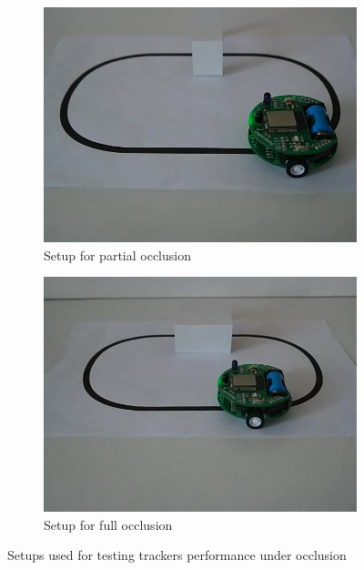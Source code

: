 \begin{figure}
\centering
\begin{subfigure}{0.48\linewidth}
\includegraphics[width=\linewidth]{img/experiments/partial-occlusion.jpg}
\caption{Setup for partial occlusion}
\label{fig:partial-occlusion}
\end{subfigure}
\begin{subfigure}{0.48\linewidth}
\includegraphics[width=\linewidth]{img/experiments/full-occlusion.jpg}
\caption{Setup for full occlusion}
\label{fig:full-occlusion}
\end{subfigure}
\caption{Setups used for testing trackers performance under occlusion}
\label{fig:occlusion}
\end{figure}

